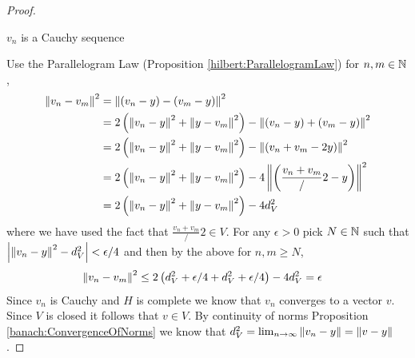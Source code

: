 \begin{proof}
\begin{clm}$v_n$ is a Cauchy sequence
\end{clm}
Use the Parallelogram Law (Proposition \ref{hilbert:ParallelogramLaw})
for $n, m \in \mathbb{N}$,
\begin{align*}
  \left \lVert v_n - v_m \right \rVert^2 &= \left \lVert \left(v_n -y \right) - \left( v_m -
                       y \right) \right \rVert^2 \\
  &=2 \left(\left \lVert v_n - y \right \rVert^2 + \left \lVert y - v_m \right \rVert^2 \right) - \left \lVert \left(v_n -y \right) + \left( v_m -
    y \right) \right \rVert^2 \\
  &=2 \left(\left \lVert v_n - y \right \rVert^2 + \left \lVert y - v_m \right \rVert^2 \right) - \left \lVert \left(v_n  +
    v_m - 2y \right) \right \rVert^2 \\
  &=2 \left(\left \lVert v_n - y \right \rVert^2 + \left \lVert y - v_m \right \rVert^2 \right) - 4\left \lVert \left(\frac{v_n  +
    v_m}/2- y \right) \right \rVert^2 \\
  &=2 \left(\left \lVert v_n - y \right \rVert^2 + \left \lVert y - v_m \right \rVert^2 \right) - 4d^2_V \\
\end{align*}
where we have used the fact that $\frac{v_n  +  v_m}/2 \in V$.   For
any $\epsilon > 0$ pick $N \in \mathbb{N}$ such that $\left \vert \left \lVert v_n -
    y \right \rVert^2 - d^2_V \right \vert < \epsilon/4$ and then by the above for $n, m \geq
N$,
\begin{align*}
  \left \lVert v_n - v_m \right \rVert^2 &\leq 2 \left(d^2_V + \epsilon/4 + d^2_V +
                       \epsilon/4\right) -4 d^2_V = \epsilon
\end{align*}
Since $v_n$ is Cauchy and $H$ is complete we know that $v_n$ converges
to a vector $v$.   Since $V$ is closed it follows that $v \in V$.  By
continuity of norms Proposition \ref{banach:ConvergenceOfNorms}  we know that $d^2_V = \lim_{n
  \to \infty} \left \lVert v_n -y \right \rVert = \left \lVert v - y \right \rVert$.


\end{proof}
